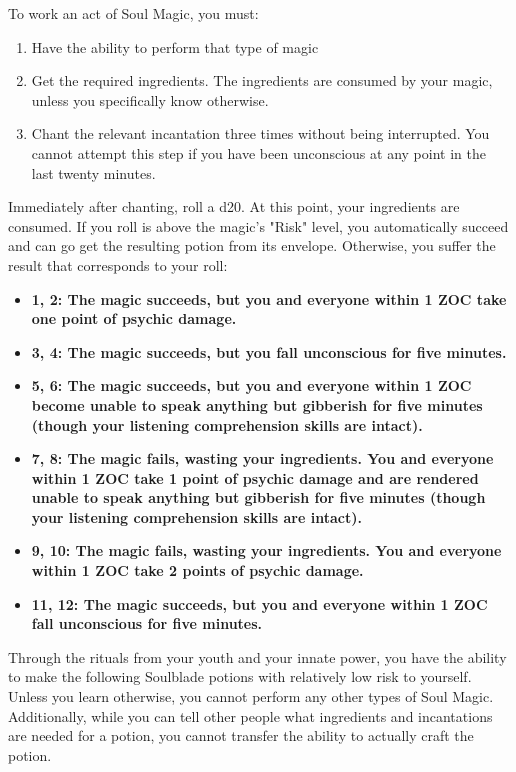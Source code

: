 \documentclass[green]{Kos}
\begin{document}
\name{\gButlerSoulMagic{}}


To work an act of Soul Magic, you must:

\begin{enumerate} 
\item Have the ability to perform that type of magic
\item Get the required ingredients. The ingredients are consumed by your magic, unless you specifically know otherwise.
\item Chant the relevant incantation three times without being interrupted. You cannot attempt this step if you have been unconscious at any point in the last twenty minutes.
\end{enumerate}

Immediately after chanting, roll a d20. At this point, your ingredients are consumed. If you roll is above the magic's "Risk" level, you automatically succeed and can go get the resulting potion from its envelope. Otherwise, you suffer the result that corresponds to your roll:

\begin{itemize}
\item \bf{1, 2:} The magic succeeds, but you and everyone within 1 ZOC take one point of psychic damage.
\item \bf{3, 4:} The magic succeeds, but you fall unconscious for five minutes.
\item \bf{5, 6:} The magic succeeds, but you and everyone within 1 ZOC become unable to speak anything but gibberish for five minutes (though your listening comprehension skills are intact).
\item \bf{7, 8:} The magic fails, wasting your ingredients.  You and everyone within 1 ZOC take 1 point of psychic damage and are rendered unable to speak anything but gibberish for five minutes (though your listening comprehension skills are intact).
\item \bf{9, 10:} The magic fails, wasting your ingredients. You and everyone within 1 ZOC take 2 points of psychic damage.
\item \bf{11, 12:} The magic succeeds, but you and everyone within 1 ZOC fall unconscious for five minutes.
\end{itemize}

Through the rituals from your youth and your innate power, you have the ability to make the following Soulblade potions with relatively low risk to yourself. Unless you learn otherwise, you cannot perform any other types of Soul Magic. Additionally, while you can tell other people what ingredients and incantations are needed for a potion, you cannot transfer the ability to actually craft the potion.
\end{document}
